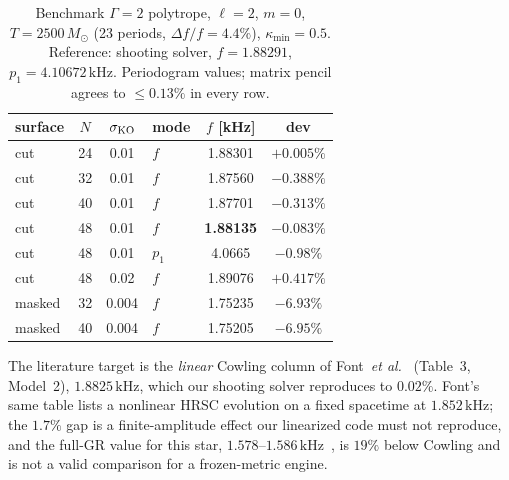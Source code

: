 \documentclass[aps,prd,reprint,amsmath,amssymb,nofootinbib,longbibliography,superscriptaddress]{revtex4-2}
\newcommand{\Msun}{M_\odot}
\newcommand{\kHz}{\,\mathrm{kHz}}
\newcommand{\KO}{\sigma_{\rm KO}}
\begin{document}
\begin{table}[tb]
\footnotesize
\caption{Benchmark $\Gamma=2$ polytrope, $\ell=2$, $m=0$, $T=2500\,\Msun$ (23 periods,
$\Delta f/f = 4.4\%$), $\kappa_{\min}=0.5$. Reference: shooting solver, $f = 1.88291$,
$p_1 = 4.10672\kHz$. Periodogram values; matrix pencil agrees to $\le0.13\%$ in every row.}
\label{tab:anchor}
\begin{ruledtabular}
\begin{tabular}{lcclcc}
surface & $N$ & $\KO$ & mode & $f$ [kHz] & dev\\
\hline
cut    & 24 & 0.01 & $f$ & 1.88301 & $+0.005\%$\\
cut    & 32 & 0.01 & $f$ & 1.87560 & $-0.388\%$\\
cut    & 40 & 0.01 & $f$ & 1.87701 & $-0.313\%$\\
cut    & 48 & 0.01 & $f$ & \textbf{1.88135} & $\bm{-0.083\%}$\\
cut    & 48 & 0.01 & $p_1$ & 4.0665 & $-0.98\%$\\
cut    & 48 & 0.02 & $f$ & 1.89076 & $+0.417\%$\\
masked & 32 & 0.004 & $f$ & 1.75235 & $-6.93\%$\\
masked & 40 & 0.004 & $f$ & 1.75205 & $-6.95\%$\\
\end{tabular}
\end{ruledtabular}
\end{table}

The literature target is the \emph{linear} Cowling column of Font~\emph{et al.}~\cite{Font2000}
(Table~3, Model~2), $1.8825\kHz$, which our shooting solver reproduces to $0.02\%$. Font's
same table lists a nonlinear HRSC evolution on a fixed spacetime at $1.852\kHz$; the $1.7\%$
gap is a finite-amplitude effect our linearized code must not reproduce, and the full-GR value
for this star, $1.578$--$1.586\kHz$~\cite{KrugerKokkotas2020,Nouri2022}, is $19\%$ below
Cowling and is not a valid comparison for a frozen-metric engine.
\end{document}

